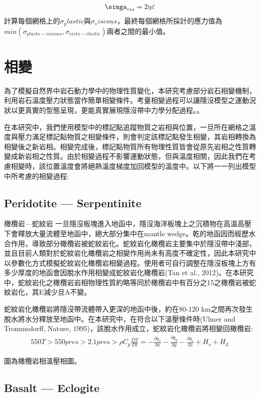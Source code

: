 \begin{align}
    \simga_{vis} = 2\eta \dot\varepsilon
    \label{eqn:viscous tensor}
\end{align}
計算每個網格上的$σ_plastic$與$σ_viscous$，最終每個網格所採計的應力值為$min(σ_{plasto-viscous}, σ_{visto-elastic})$兩者之間的最小值。
\section{相變}

為了模擬自然界中岩石動力學中的物理性質變化，本研究考慮部分岩石相變機制，利用岩石溫度壓力狀態當作簡單相變條件。考量相變過程可以讓隱沒模型之運動況狀以更真實的型態呈現，更能真實展現隱沒帶中力學分配過程。。

在本研究中，我們使用模型中的標記點追蹤物質之岩相與位置，一旦所在網格之溫度與壓力滿足標記點物質之相變條件，則會判定該標記點發生相變，其岩相轉換為相變後之新岩相。相變完成後，標記點物質所有物理性質皆會從原先岩相之性質轉變成新岩相之性質。由於相變過程不影響運動狀態，但與溫度相關，因此我們在考慮相變時，該位置溫度會將絕熱溫度梯度加回模型的溫度中。以下將一一列出模型中所考慮的相變過程:

\subsection{Peridotite --- Serpentinite}
橄欖岩---蛇紋岩
一旦隱沒板塊進入地函中，隱沒海洋板塊上之沉積物在高溫高壓下會釋放大量流體至地函中，絕大部分集中在mantle wedge。乾的地函因而經歷水合作用，導致部分橄欖岩被蛇紋岩化。蛇紋岩化橄欖岩主要集中於隱沒帶中淺部，並且目前人類對於蛇紋岩化橄欖岩之相變作用尚未有高度不確定性，因此本研究中以參數化方式模擬蛇紋岩化橄欖岩相變過程。使用者可自行調整在隱沒板塊上方有多少厚度的地函會因脫水作用相變成蛇紋岩化橄欖岩(Tan et al., 2012)。在本研究中，蛇紋岩化之橄欖岩岩相物理性質約略等同於橄欖岩中有百分之15之橄欖岩被蛇紋岩化，其E減少旦A不變。
   
蛇紋岩化橄欖岩將隱沒帶流體帶入更深的地函中後，約在80-120 km之間再次發生脫水將水分釋放至地函中。在本研究中，在符合以下溫壓條件時(Ulmer and Trommsdorff, Nature, 1995)，該脫水作用成立，蛇紋岩化橄欖岩將相變回橄欖岩:
\begin{align}
550
T> 550
pres > 2.1 
pres > 
\rho C_p \frac{DT}{Dt} = -\frac{\partial q_x}{\partial x}-\frac{\partial q_y}{\partial y}-\frac{\partial q_z}{\partial z}+H_s+H_L
\end{align}

圖為橄欖岩相溫壓相圖。

\subsection{Basalt --- Eclogite}

